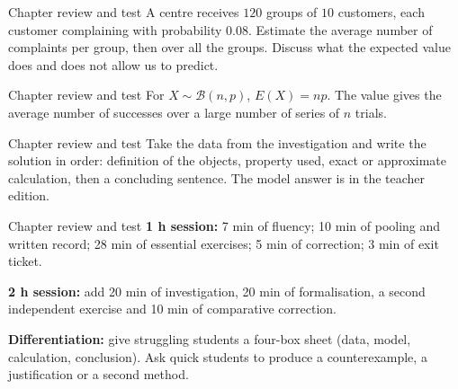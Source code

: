\documentclass[aspectratio=169,10pt]{beamer}
\begin{document}
\begin{frame}{Chapter review and test}
A centre receives \(120\) groups of \(10\) customers, each customer complaining with probability \(0.08\). Estimate the average number of complaints per group, then over all the groups. Discuss what the expected value does and does not allow us to predict.
\end{frame}
\begin{frame}{Chapter review and test}
For \(X\sim\mathcal B(n,p)\), \(E(X)=np\). The value gives the average number of successes over a large number of series of \(n\) trials.
\end{frame}
\begin{frame}{Chapter review and test}
Take the data from the investigation and write the solution in order: definition of the objects, property used, exact or approximate calculation, then a concluding sentence. The model answer is in the teacher edition.
\end{frame}
\begin{frame}{Chapter review and test}
\textbf{1 h session:} 7 min of fluency; 10 min of pooling and written record; 28 min of essential exercises; 5 min of correction; 3 min of exit ticket.

\textbf{2 h session:} add 20 min of investigation, 20 min of formalisation, a second independent exercise and 10 min of comparative correction.

\textbf{Differentiation:} give struggling students a four-box sheet (data, model, calculation, conclusion). Ask quick students to produce a counterexample, a justification or a second method.
\end{frame}
\end{document}
